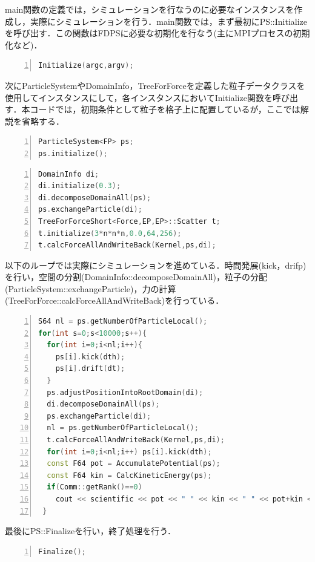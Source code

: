 \documentclass{jspf}            %
\begin{document}
main関数の定義では，シミュレーションを行なうのに必要なインスタンスを作成し，実際にシミュレーションを行う．main関数では，まず最初にPS::Initializeを呼び出す．この関数はFDPSに必要な初期化を行なう(主にMPIプロセスの初期化など)．
 \begin{lstlisting}[language=c++,numbers=left,numbersep=5pt,frame=single,basicstyle=\footnotesize]
Initialize(argc,argv);
\end{lstlisting}
 次にParticleSystemやDomainInfo，TreeForForceを定義した粒子データクラスを使用してインスタンスにして，各インスタンスにおいてInitialize関数を呼び出す．本コードでは，初期条件として粒子を格子上に配置しているが，ここでは解説を省略する．
\begin{lstlisting}[language=c++,numbers=left,numbersep=5pt,frame=single,basicstyle=\footnotesize]
ParticleSystem<FP> ps;
ps.initialize();
\end{lstlisting}
\begin{lstlisting}[language=c++,numbers=left,numbersep=5pt,frame=single,basicstyle=\footnotesize]
DomainInfo di;
di.initialize(0.3);
di.decomposeDomainAll(ps);
ps.exchangeParticle(di);
TreeForForceShort<Force,EP,EP>::Scatter t;
t.initialize(3*n*n*n,0.0,64,256);
t.calcForceAllAndWriteBack(Kernel,ps,di);
\end{lstlisting}
以下のループでは実際にシミュレーションを進めている．時間発展(kick，drifp)を行い，空間の分割(DomainInfo::decomposeDomainAll)，粒子の分配(ParticleSystem::exchangeParticle)，力の計算(TreeForForce::calcForceAllAndWriteBack)を行っている．
\begin{lstlisting}[language=c++,numbers=left,numbersep=5pt,frame=single,basicstyle=\footnotesize]
S64 nl = ps.getNumberOfParticleLocal();
for(int s=0;s<10000;s++){
  for(int i=0;i<nl;i++){
    ps[i].kick(dth);
    ps[i].drift(dt);
  }
  ps.adjustPositionIntoRootDomain(di);
  di.decomposeDomainAll(ps);
  ps.exchangeParticle(di);
  nl = ps.getNumberOfParticleLocal();
  t.calcForceAllAndWriteBack(Kernel,ps,di);
  for(int i=0;i<nl;i++) ps[i].kick(dth);
  const F64 pot = AccumulatePotential(ps);
  const F64 kin = CalcKineticEnergy(ps);
  if(Comm::getRank()==0)
    cout << scientific << pot << " " << kin << " " << pot+kin << endl;
 }
\end{lstlisting}
最後にPS::Finalizeを行い，終了処理を行う．
\begin{lstlisting}[language=c++,numbers=left,numbersep=5pt,frame=single,basicstyle=\footnotesize]
Finalize();
\end{lstlisting}
\end{document}
